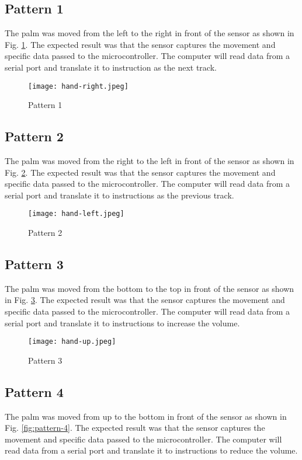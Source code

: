 \documentclass[conference,a4paper]{IEEEtran}
\begin{document}
\subsection{Pattern 1}
The palm was moved from the left to the right in front of the sensor as shown in Fig. \ref{fig:pattern-1}. The expected result was that the sensor captures the movement and specific data passed to the microcontroller. The computer will read data from a serial port and translate it to instruction as the next track.

\begin{figure}[!h]
    \centering
    \texttt{[image: hand-right.jpeg]}
    \caption{Pattern 1}
    \label{fig:pattern-1}
\end{figure}

\subsection{Pattern 2}
The palm was moved from the right to the left in front of the sensor as shown in Fig. \ref{fig:pattern-2}. The expected result was that the sensor captures the movement and specific data passed to the microcontroller. The computer will read data from a serial port and translate it to instructions as the previous track.

\begin{figure}[!h]
    \centering
    \texttt{[image: hand-left.jpeg]}
    \caption{Pattern 2}
    \label{fig:pattern-2}
\end{figure}

\subsection{Pattern 3}
The palm was moved from the bottom to the top in front of the sensor as shown in Fig. \ref{fig:pattern-3}. The expected result was that the sensor captures the movement and specific data passed to the microcontroller. The computer will read data from a serial port and translate it to instructions to increase the volume.

\begin{figure}[!h]
    \centering
    \texttt{[image: hand-up.jpeg]}
    \caption{Pattern 3}
    \label{fig:pattern-3}
\end{figure}

\subsection{Pattern 4}
The palm was moved from up to the bottom in front of the sensor as shown in Fig. \ref{fig:pattern-4}. The expected result was that the sensor captures the movement and specific data passed to the microcontroller. The computer will read data from a serial port and translate it to instructions to reduce the volume.
\end{document}

